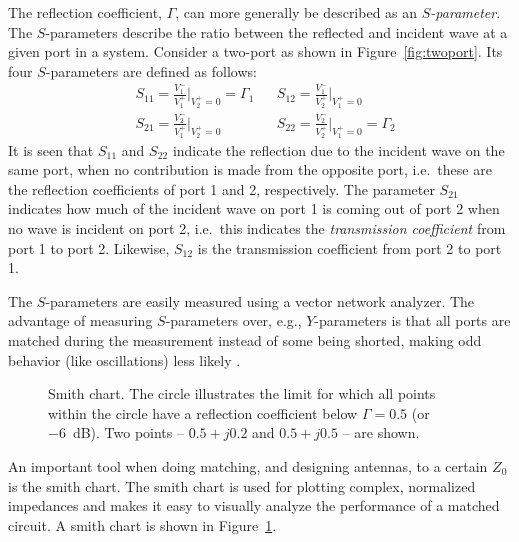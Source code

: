 The reflection coefficient, $\Gamma$, can more generally be described as an \emph{$S$-parameter}. The $S$-parameters describe the ratio between the reflected and incident wave at a given port in a system. Consider a two-port as shown in Figure~\ref{fig:twoport}. Its four $S$-parameters are defined as follows:
\begin{equation}
    \begin{aligned}
        &S_{11} = \frac{V_1^-}{V_1^+} \Bigg|_{V_2^+=0} = \Gamma_1
        &&S_{12} = \frac{V_1^-}{V_2^+} \Bigg|_{V_1^+=0} \\
        &S_{21} = \frac{V_2^-}{V_1^+} \Bigg|_{V_2^+=0}
        &&S_{22} = \frac{V_2^-}{V_2^+} \Bigg|_{V_1^+=0} = \Gamma_2
    \end{aligned}
\end{equation}
It is seen that $S_{11}$ and $S_{22}$ indicate the reflection due to the incident wave on the same port, when no contribution is made from the opposite port, i.e.\ these are the reflection coefficients of port 1 and 2, respectively. The parameter $S_{21}$ indicates how much of the incident wave on port 1 is coming out of port 2 when no wave is incident on port 2, i.e.\ this indicates the \emph{transmission coefficient} from port 1 to port 2. Likewise, $S_{12}$ is the transmission coefficient from port 2 to port 1.

The $S$-parameters are easily measured using a vector network analyzer. The advantage of measuring $S$-parameters over, e.g., $Y$-parameters is that all ports are matched during the measurement instead of some being shorted, making odd behavior (like oscillations) less likely \cite{Bowick2007}.

\begin{figure}[htbp]
    \centering
    \caption{Smith chart. The circle illustrates the limit for which all points within the circle have a reflection coefficient below $\Gamma=0.5$ (or \SI{-6}{dB}). Two points -- $0.5+j0.2$ and $0.5+j0.5$ -- are shown.}
    \label{fig:smithchart}
\end{figure}
An important tool when doing matching, and designing antennas, to a certain $Z_0$ is the smith chart. The smith chart is used for plotting complex, normalized impedances and makes it easy to visually analyze the performance of a matched circuit. A smith chart is shown in Figure~\ref{fig:smithchart}.

